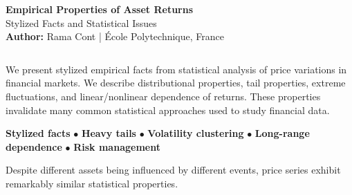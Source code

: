 \documentclass[final]{beamer}
\begin{document}
\begin{frame}[t]

\begin{tcolorbox}[colback=white,colframe=headerred,boxrule=2pt,arc=0pt,
    left=10pt,right=10pt,top=5pt,bottom=5pt]
\begin{minipage}{0.12\linewidth}
\centering
\end{minipage}
\hfill
\begin{minipage}{1.0\linewidth}
\centering
{\fontsize{65}{78}\selectfont\textbf{Empirical Properties of Asset Returns}}\\[0.3cm]
{\fontsize{48}{58}\selectfont Stylized Facts and Statistical Issues}\\[0.2cm]
{\Large\textbf{Author:} Rama Cont | École Polytechnique, France}
\end{minipage}
\end{tcolorbox}

\vspace{0.6cm}

\begin{columns}[t]

\begin{column}{.48\linewidth}

\begin{tcolorbox}[mybox, title=Abstract]
\large
We present stylized empirical facts from statistical analysis of price variations in financial markets. We describe distributional properties, tail properties, extreme fluctuations, and linear/nonlinear dependence of returns. These properties invalidate many common statistical approaches used to study financial data.
\end{tcolorbox}

\vspace{0.5cm}

\begin{tcolorbox}[mybox, title=Keywords]
\large
\textbf{Stylized facts} $\bullet$ \textbf{Heavy tails} $\bullet$ \textbf{Volatility clustering} $\bullet$ \textbf{Long-range dependence} $\bullet$ \textbf{Risk management}
\end{tcolorbox}

\vspace{0.5cm}

\begin{tcolorbox}[mybox, title=Motivation]
\large
Despite different assets being influenced by different events, price series exhibit remarkably similar statistical properties.


\end{tcolorbox}
\end{column}
\end{columns}
\end{frame}
\end{document}
